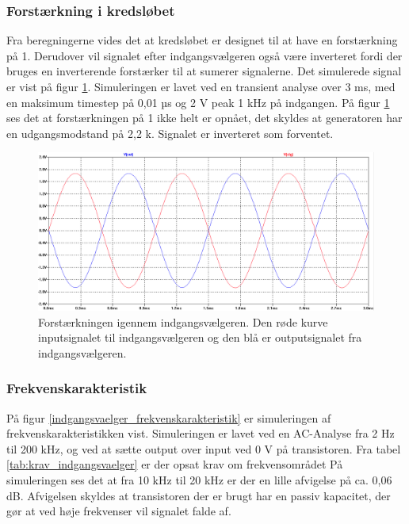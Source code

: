 \subsubsection*{Forstærkning i kredsløbet}
Fra beregningerne vides det at kredsløbet er designet til at have en forstærkning på 1. Derudover vil signalet efter indgangsvælgeren også være inverteret fordi der bruges en inverterende forstærker til at sumerer signalerne. Det simulerede signal er vist på figur \ref{indgangsvaelger_input/output}. Simuleringen er lavet ved en transient analyse over 3 ms, med en maksimum timestep på 0,01 µs og 2 V peak 1 kHz på indgangen. På figur \ref{indgangsvaelger_input/output} ses det at forstærkningen på 1 ikke helt er opnået, det skyldes at generatoren har en udgangsmodstand på 2,2 k\ohm. Signalet er inverteret som forventet. 
\begin{figure}[h]
\centering
\includegraphics[width=\textwidth]{teknisk/indgangsvaelger/simulering/input_output.png}
\caption{Forstærkningen igennem indgangsvælgeren. Den røde kurve inputsignalet til indgangsvælgeren og den blå er outputsignalet fra indgangsvælgeren.}
\label{indgangsvaelger_input/output}
\end{figure}

\subsubsection*{Frekvenskarakteristik}
På figur \ref{indgangsvaelger_frekvenskarakteristik} er simuleringen af frekvenskarakteristikken vist. Simuleringen er lavet ved en AC-Analyse fra 2 Hz til 200 kHz, og ved at sætte output over input ved 0 V på transistoren. Fra tabel \ref{tab:krav_indgangsvaelger} er der opsat krav om frekvensområdet På simuleringen ses det at fra 10 kHz til 20 kHz er der en lille afvigelse på ca. 0,06 dB. Afvigelsen skyldes at transistoren der er brugt har en passiv kapacitet, der gør at ved høje frekvenser vil signalet falde af.

